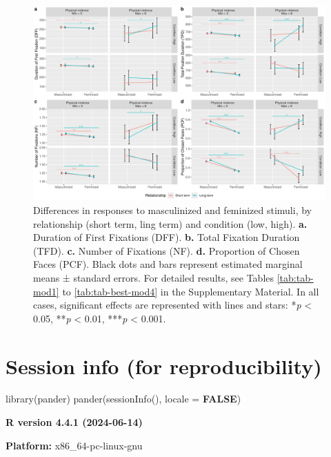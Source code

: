 \documentclass[
  bookmarksnumbered]{article}
\newenvironment{Shaded}{\begin{snugshade}}{\end{snugshade}}
\newcommand{\AttributeTok}[1]{\textcolor[rgb]{0.80,0.80,0.80}{#1}}
\newcommand{\ConstantTok}[1]{\textcolor[rgb]{0.86,0.64,0.64}{\textbf{#1}}}
\newcommand{\FunctionTok}[1]{\textcolor[rgb]{0.94,0.94,0.56}{#1}}
\newcommand{\NormalTok}[1]{\textcolor[rgb]{0.80,0.80,0.80}{#1}}
\begin{document}
\begin{figure}
\centering
\includegraphics{Supplementary_material_files/figure-latex/unnamed-chunk-51-1.pdf}
\caption{\label{fig:unnamed-chunk-51}Differences in responses to masculinized and feminized stimuli, by relationship (short term, ling term) and condition (low, high). \textbf{a.} Duration of First Fixations (DFF). \textbf{b.} Total Fixation Duration (TFD). \textbf{c.} Number of Fixations (NF). \textbf{d.} Proportion of Chosen Faces (PCF). Black dots and bars represent estimated marginal means ± standard errors. For detailed results, see Tables \ref{tab:tab-mod1} to \ref{tab:tab-best-mod4} in the Supplementary Material. In all cases, significant effects are represented with lines and stars: *\emph{p} \textless{} 0.05, **\emph{p} \textless{} 0.01, ***\emph{p} \textless{} 0.001.}
\end{figure}

\section{Session info (for reproducibility)}\label{session}

\begin{Shaded}
\begin{Highlighting}[]
\FunctionTok{library}\NormalTok{(pander)}
\FunctionTok{pander}\NormalTok{(}\FunctionTok{sessionInfo}\NormalTok{(), }\AttributeTok{locale =} \ConstantTok{FALSE}\NormalTok{)}
\end{Highlighting}
\end{Shaded}

\textbf{R version 4.4.1 (2024-06-14)}

\textbf{Platform:} x86\_64-pc-linux-gnu
\end{document}
